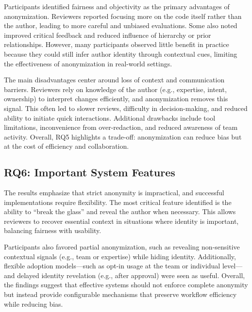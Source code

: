 Participants identified fairness and objectivity as the primary advantages of anonymization. Reviewers reported focusing more on the code itself rather than the author, leading to more careful and unbiased evaluations. Some also noted improved critical feedback and reduced influence of hierarchy or prior relationships. However, many participants observed little benefit in practice because they could still infer author identity through contextual cues, limiting the effectiveness of anonymization in real-world settings.

The main disadvantages center around loss of context and communication barriers. Reviewers rely on knowledge of the author (e.g., expertise, intent, ownership) to interpret changes efficiently, and anonymization removes this signal. This often led to slower reviews, difficulty in decision-making, and reduced ability to initiate quick interactions. Additional drawbacks include tool limitations, inconvenience from over-redaction, and reduced awareness of team activity. Overall, RQ5 highlights a trade-off: anonymization can reduce bias but at the cost of efficiency and collaboration.

\subsection{RQ6: Important System Features}

The results emphasize that strict anonymity is impractical, and successful implementations require flexibility. The most critical feature identified is the ability to “break the glass” and reveal the author when necessary. This allows reviewers to recover essential context in situations where identity is important, balancing fairness with usability.

Participants also favored partial anonymization, such as revealing non-sensitive contextual signals (e.g., team or expertise) while hiding identity. Additionally, flexible adoption models—such as opt-in usage at the team or individual level—and delayed identity revelation (e.g., after approval) were seen as useful. Overall, the findings suggest that effective systems should not enforce complete anonymity but instead provide configurable mechanisms that preserve workflow efficiency while reducing bias.

